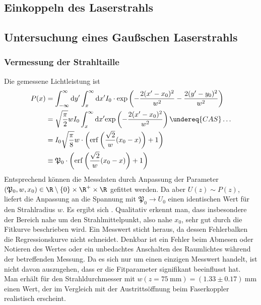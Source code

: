 \documentclass[11pt,a4paper,oneside]{scrartcl}
\begin{document}
\subsection{Einkoppeln des Laserstrahls}
\subsection{Untersuchung eines Gaußschen Laserstrahls}
\subsubsection{Vermessung der Strahltaille}\label{Auswertung Vermessung der Strahltaille}
Die gemessene Lichtleistung ist 
\begin{align}
P(x)&=\int_{-\infty}^\infty \mathrm dy^\prime \int_x^\infty \mathrm dx^\prime I_0\cdot\mathrm{exp}\left(-\frac{2(x^\prime-x_0)^2}{w^2}-\frac{2(y^\prime-y_0)^2}{w^2}\right) \\ \quad& = \sqrt{\frac{\pi}{2}}wI_0\int_x^\infty \mathrm dx^\prime \mathrm{exp}\left(-\frac{2(x^\prime-x_0)^2}{w^2}\right) \undereq{CAS}\hdots \\ \quad& =I_0\sqrt{\frac{\pi}{8}}w\cdot\left(\mathrm{erf}\left(\frac{\sqrt{2}}{w}(x_0-x)\right)+1\right)\\ \quad& \equiv \mathfrak{P}_0\cdot\left(\mathrm{erf}\left(\frac{\sqrt{2}}{w}(x_0-x)\right)+1\right)
\end{align}
Entsprechend können die Messdaten durch Anpassung der Parameter $(\mathfrak P_0,w,x_0)\in \R\setminus\{0\}\times\R^+\times\R$ gefittet werden. Da aber $U(z)\sim P(z)$, liefert die Anpassung an die Spannung mit $\mathfrak P_0\rightarrow U_0$ einen identischen Wert für den Strahlradius $w$.
Es ergibt sich . Qualitativ erkennt man, dass insbesondere der Bereich nahe um den Strahlmittelpunkt, also nahe $x_0$, sehr gut durch die Fitkurve beschrieben wird. Ein Messwert sticht heraus, da dessen Fehlerbalken die Regressionskurve nicht schneidet. Denkbar ist ein Fehler beim Abmesen oder Notieren des Wertes oder ein unbedachtes Anschalten des Raumlichtes während der betreffenden Messung. Da es sich nur um einen einzigen Messwert handelt, ist nicht davon auszugehen, dass er die Fitparameter signifikant beeinflusst hat. \\
Man erhält für den Strahldurchmesser mit $w(z=75\ \mathrm{mm})=(1.33\pm0.17)\ \mathrm{mm}$ einen Wert, der im Vergleich mit der Austrittsöffnung beim Faserkoppler realistisch erscheint.
\end{document}
